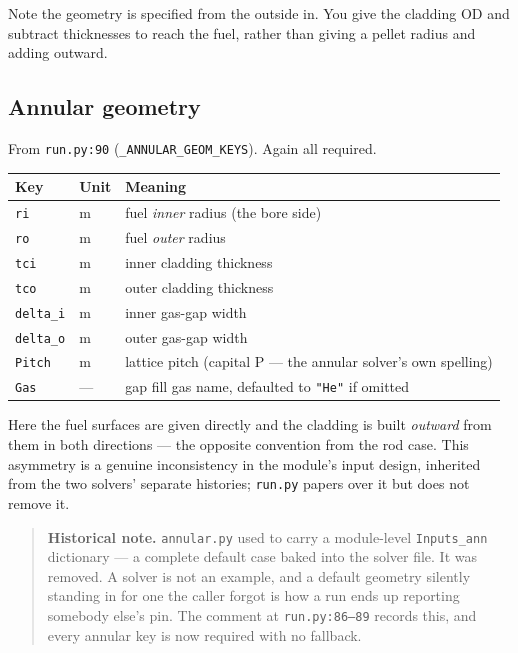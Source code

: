 \documentclass[11pt]{article}
\newcommand{\code}[1]{\texttt{#1}}
\begin{document}
Note the geometry is specified from the outside in. You give the cladding OD and
subtract thicknesses to reach the fuel, rather than giving a pellet radius and adding
outward.

\subsection{Annular geometry}
From \code{run.py:90} (\code{\_ANNULAR\_GEOM\_KEYS}). Again all required.

\begin{center}
\begin{tabular}{llp{7.2cm}}
\toprule
Key & Unit & Meaning \\
\midrule
\code{ri}      & m & fuel \emph{inner} radius (the bore side) \\
\code{ro}      & m & fuel \emph{outer} radius \\
\code{tci}     & m & inner cladding thickness \\
\code{tco}     & m & outer cladding thickness \\
\code{delta\_i} & m & inner gas-gap width \\
\code{delta\_o} & m & outer gas-gap width \\
\code{Pitch}   & m & lattice pitch (capital P --- the annular solver's own spelling) \\
\code{Gas}     & --- & gap fill gas name, defaulted to \code{"He"} if omitted \\
\bottomrule
\end{tabular}
\end{center}

Here the fuel surfaces are given directly and the cladding is built \emph{outward} from
them in both directions --- the opposite convention from the rod case. This asymmetry is
a genuine inconsistency in the module's input design, inherited from the two solvers'
separate histories; \code{run.py} papers over it but does not remove it.

\begin{quote}
\textbf{Historical note.} \code{annular.py} used to carry a module-level
\code{Inputs\_ann} dictionary --- a complete default case baked into the solver file.
It was removed. A solver is not an example, and a default geometry silently standing in
for one the caller forgot is how a run ends up reporting somebody else's pin. The
comment at \code{run.py:86--89} records this, and every annular key is now required with
no fallback.
\end{quote}
\end{document}
